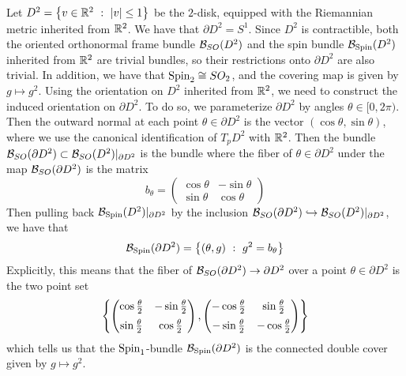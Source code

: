 \begin{exmp}
Let $D^2 = \left\lbrace v \in \mathbb{R}^2 ~:~ |v| \leq 1 \right\rbrace$ be the $2$-disk, equipped with the
Riemannian metric inherited from $\mathbb{R}^2$. We have that $\partial D^2 = S^1$.
Since $D^2$ is contractible, both the oriented orthonormal frame bundle
$\mathcal{B}_{SO}(D^2)$ and the spin bundle $\mathcal{B}_{\mathrm{Spin}}(D^2)$ inherited from $\mathbb{R}^2$ are
trivial bundles, so their restrictions onto $\partial D^2$ are also trivial.
In addition, we have that $\mathrm{Spin}_2 \cong SO_2$, and the covering map is given
by $g \mapsto g^2$.
Using the orientation on $D^2$ inherited from $\mathbb{R}^2$, we need to construct
the induced orientation on $\partial D^2$. To do so, we parameterize
$\partial D^2$ by angles $\theta \in [0,2\pi)$. Then the outward normal
at each point $\theta \in \partial D^2$ is the vector $(\cos\theta, \sin\theta)$,
where we use the canonical identification of $T_pD^2$ with $\mathbb{R}^2$. Then
the bundle $\mathcal{B}_{SO}(\partial D^2) \subset \mathcal{B}_{SO}(D^2)\vert_{\partial D^2}$ is
the bundle where the fiber of $\theta \in \partial D^2$ under the map $
\mathcal{B}_{SO}(\partial D^2)$ is the matrix
\[
b_\theta = \begin{pmatrix}
\cos\theta & -\sin\theta \\
\sin\theta & \cos\theta
\end{pmatrix}
\]
Then pulling back $\mathcal{B}_{\mathrm{Spin}}(D^2)\vert_{\partial D^2}$ by the inclusion
$\mathcal{B}_{SO}(\partial D^2) \hookrightarrow \mathcal{B}_{SO}(D^2)\vert_{\partial D^2}$,
we have that
\[
\mathcal{B}_{\mathrm{Spin}}(\partial D^2) = \left\lbrace (\theta, g) ~:~ g^2 = b_\theta \right\rbrace
\]
Explicitly, this means that the fiber of $\mathcal{B}_{SO}(\partial D^2) \to \partial D^2$
over a point $\theta \in \partial D^2$ is the two point set
\[
\left\lbrace \begin{pmatrix}
\cos\frac{\theta}{2} & -\sin\frac{\theta}{2} \\[5pt]
\sin\frac{\theta}{2} & \cos\frac{\theta}{2}
\end{pmatrix},
\begin{pmatrix}
-\cos\frac{\theta}{2} & \sin\frac{\theta}{2} \\[5pt]
-\sin\frac{\theta}{2} & -\cos\frac{\theta}{2}
\end{pmatrix} \right\rbrace
\]
which tells us that the $\mathrm{Spin}_1$-bundle $\mathcal{B}_{\mathrm{Spin}}(\partial D^2)$ is the
connected double cover given by $g \mapsto g^2$.
\end{exmp}
%
%
